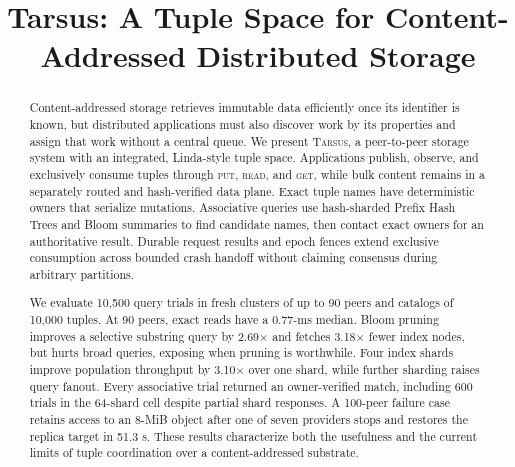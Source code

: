 \documentclass[conference]{IEEEtran}
\newcommand{\system}{\textsc{Tarsus}\xspace}
\newcommand{\putop}{\textsc{put}\xspace}
\newcommand{\readop}{\textsc{read}\xspace}
\newcommand{\getop}{\textsc{get}\xspace}
\newif\ifanonymous
\begin{document}
\title{Tarsus: A Tuple Space for Content-Addressed Distributed Storage}

\ifanonymous
\author{\IEEEauthorblockN{Anonymous Authors}}
\else
\author{
}
\fi

\maketitle

\begin{abstract}
Content-addressed storage retrieves immutable data efficiently once its
identifier is known, but distributed applications must also discover work by
its properties and assign that work without a central queue. We present
\system, a peer-to-peer storage system with an integrated, Linda-style tuple
space. Applications publish, observe, and exclusively consume tuples through
\putop, \readop, and \getop, while bulk content remains in a separately routed
and hash-verified data plane. Exact tuple names have deterministic owners that
serialize mutations. Associative queries use hash-sharded Prefix Hash Trees
and Bloom summaries to find candidate names, then contact exact owners for an
authoritative result. Durable request results and epoch fences extend
exclusive consumption across bounded crash handoff without claiming consensus
during arbitrary partitions.

We evaluate 10,500 query trials in fresh clusters of up to 90 peers and
catalogs of 10,000 tuples. At 90 peers, exact reads have a 0.77-ms median.
Bloom pruning improves a selective substring query by 2.69$\times$ and fetches
3.18$\times$ fewer index nodes, but hurts broad queries, exposing when pruning
is worthwhile. Four index shards improve population throughput by
3.10$\times$ over one shard, while further sharding raises query fanout. Every
associative trial returned an owner-verified match, including 600 trials in the
64-shard cell despite partial shard responses. A 100-peer failure case retains
access to an 8-MiB object after one of seven providers stops and restores the
replica target in 51.3 s. These results characterize both the usefulness and
the current limits of tuple coordination over a content-addressed substrate.
\end{abstract}
\end{document}
